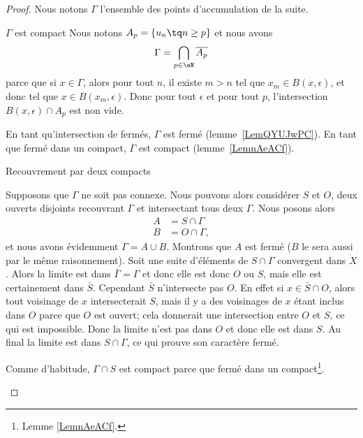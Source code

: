 \begin{proof}
	Nous notons \( \Gamma\) l'ensemble des points d'accumulation de la suite.
	\begin{subproof}
		\item[\( \Gamma\) est compact]
		Nous notons \( A_p=\{ u_n\tq n\geq p \}\) et nous avons
		\begin{equation}
			\Gamma=\bigcap_{p\in \eN}\overline{ A_p }
		\end{equation}
		parce que si \( x\in\Gamma\), alors pour tout \( n\), il existe \( m>n\) tel que \( x_m\in B(x,\epsilon)\), et donc tel que \( x\in B(x_m,\epsilon)\). Donc pour tout \( \epsilon\) et pour tout \( p\), l'intersection \( B(x,\epsilon)\cap A_p\) est non vide.

		En tant qu'intersection de fermés, \( \Gamma\) est fermé (lemme~\ref{LemQYUJwPC}). En tant que fermé dans un compact, \( \Gamma\) est compact (lemme~\ref{LemnAeACf}).

		\item[Recouvrement par deux compacts]

		Supposons que \( \Gamma\) ne soit pas connexe. Nous pouvons alors considérer \( S\) et \( O\), deux ouverts disjoints recouvrant \( \Gamma\) et intersectant tous deux \( \Gamma\). Nous posons alors
		\begin{subequations}
			\begin{align}
				A & =S\cap\Gamma  \\
				B & =O\cap\Gamma,
			\end{align}
		\end{subequations}
		et nous avons évidemment \( \Gamma=A\cup B\). Montrons que \( A\) est fermé (\( B\) le sera aussi par le même raisonnement). Soit une suite d'éléments de \( S\cap \Gamma\) convergent dans \( X\). Alors la limite est dans \( \bar\Gamma=\Gamma\) et donc elle est donc \( O\) ou \( S\), mais elle est certainement dans \( \bar S\). Cependant \( \bar S\) n'intersecte pas \( O\). En effet si \( x\in \bar S\cap O\), alors tout voisinage de \( x\) intersecterait \( S\), mais il y a des voisinages de \( x\) étant inclus dans \( O\) parce que \( O\) est ouvert; cela donnerait une intersection entre \( O\) et \( S\), ce qui est impossible. Donc la limite n'est pas dans \( O\) et donc elle est dans \( S\). Au final la limite est dans \( S\cap \Gamma\), ce qui prouve son caractère fermé.

		Comme d'habitude, \( \Gamma\cap S\) est compact parce que fermé dans un compact\footnote{Lemme \ref{LemnAeACf}.}.


\end{subproof}
\end{proof}
